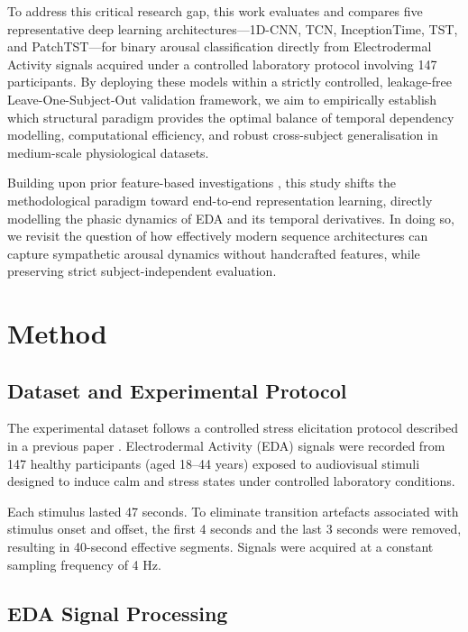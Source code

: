 \documentclass[runningheads]{llncs}
\begin{document}
To address this critical research gap, this work evaluates and compares five representative deep learning architectures---1D-CNN, TCN, InceptionTime, TST, and PatchTST---for binary arousal classification directly from Electrodermal Activity signals acquired under a controlled laboratory protocol involving 147 participants. By deploying these models within a strictly controlled, leakage-free Leave-One-Subject-Out validation framework, we aim to empirically establish which structural paradigm provides the optimal balance of temporal dependency modelling, computational efficiency, and robust cross-subject generalisation in medium-scale physiological datasets.

Building upon prior feature-based investigations \cite{SanchezReolid2022}, this study shifts the methodological paradigm toward end-to-end representation learning, directly modelling the phasic dynamics of EDA and its temporal derivatives. In doing so, we revisit the question of how effectively modern sequence architectures can capture sympathetic arousal dynamics without handcrafted features, while preserving strict subject-independent evaluation.

\section{Method}

\subsection{Dataset and Experimental Protocol}

The experimental dataset follows a controlled stress elicitation protocol described in a previous paper \cite{sanchez2020deep}. Electrodermal Activity (EDA) signals were recorded from 147 healthy participants (aged 18--44 years) exposed to audiovisual stimuli designed to induce calm and stress states under controlled laboratory conditions.

Each stimulus lasted 47 seconds. To eliminate transition artefacts associated with stimulus onset and offset, the first 4 seconds and the last 3 seconds were removed, resulting in 40-second effective segments. Signals were acquired at a constant sampling frequency of 4 Hz.

\subsection{EDA Signal Processing}
\end{document}
